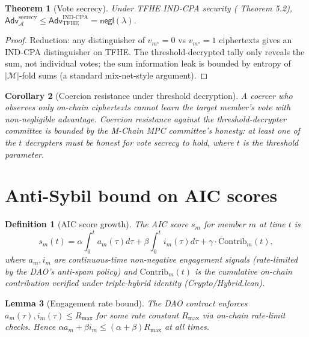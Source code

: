 \documentclass[11pt]{article}
\newtheorem{theorem}{Theorem}
\newtheorem{lemma}[theorem]{Lemma}
\newtheorem{corollary}[theorem]{Corollary}
\newtheorem{definition}{Definition}
\begin{document}
\begin{theorem}[Vote secrecy]
\label{thm:secrecy}
Under TFHE IND-CPA security
(\cite{tfhe} Theorem 5.2),
$\mathsf{Adv}^{\mathrm{secrecy}}_{\mathcal{A}} \leq
\mathsf{Adv}^{\mathrm{IND\text{-}CPA}}_{\mathrm{TFHE}} =
\mathsf{negl}(\lambda)$.
\end{theorem}

\begin{proof}
Reduction: any distinguisher of $v_{m^\star} = 0$ vs $v_{m^\star}=1$
ciphertexts gives an IND-CPA distinguisher on TFHE. The
threshold-decrypted tally only reveals the sum, not individual
votes; the sum information leak is bounded by entropy of
$|\mathcal{M}|$-fold sums (a standard mix-net-style argument).
\end{proof}

\begin{corollary}[Coercion resistance under threshold decryption]
\label{cor:coerc}
A coercer who observes only on-chain ciphertexts cannot learn the
target member's vote with non-negligible advantage. Coercion
resistance against the threshold-decrypter committee is bounded by
the M-Chain MPC committee's honesty: at least one of the
$t$ decrypters must be honest for vote secrecy to hold, where
$t$ is the threshold parameter.
\end{corollary}

\section{Anti-Sybil bound on AIC scores}
\label{sec:sybil}

\begin{definition}[AIC score growth]
\label{def:aic}
The AIC score $s_m$ for member $m$ at time $t$ is
\[
  s_m(t) = \alpha \int_0^t a_m(\tau) d\tau +
            \beta \int_0^t i_m(\tau) d\tau +
            \gamma \cdot \mathrm{Contrib}_m(t),
\]
where $a_m, i_m$ are continuous-time non-negative engagement signals
(rate-limited by the DAO's anti-spam policy) and
$\mathrm{Contrib}_m(t)$ is the cumulative on-chain contribution
verified under triple-hybrid identity (Crypto/Hybrid.lean).
\end{definition}

\begin{lemma}[Engagement rate bound]
\label{lem:engage}
The DAO contract enforces
$a_m(\tau), i_m(\tau) \leq R_{\max}$ for some rate
constant $R_{\max}$ via on-chain rate-limit checks. Hence
$\alpha a_m + \beta i_m \leq (\alpha + \beta) R_{\max}$ at all
times.
\end{lemma}
\end{document}
